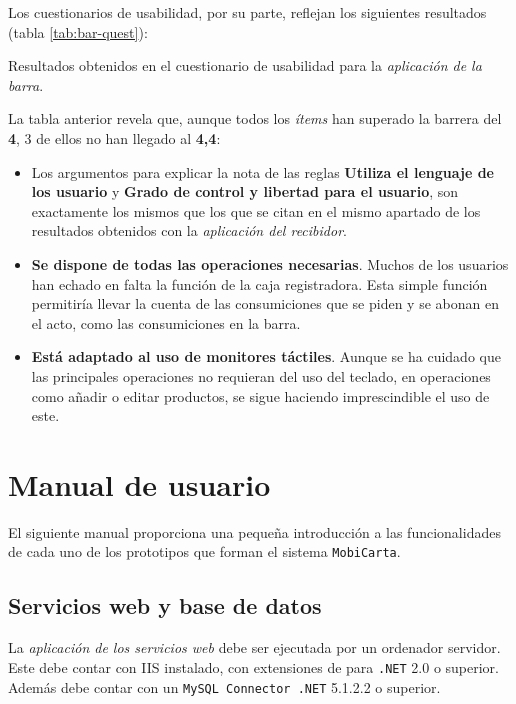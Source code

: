 Los cuestionarios de usabilidad, por su parte, reflejan los siguientes
resultados (tabla \ref{tab:bar-quest}):

\begin{table}[H]
  \centering
  \label{tab:bar-quest}
  {\normalsize
  
  }  
  \caption[Resultados obtenidos en el cuestionario de usabilidad para la
  \emph{aplicación de la barra}.]{Resultados obtenidos en el cuestionario de 
  usabilidad para la \emph{aplicación de la barra}.}
\end{table}

La tabla anterior revela que, aunque todos los \emph{ítems} han superado la
barrera del \textbf{4}, 3 de ellos no han llegado al \textbf{4,4}:
\begin{itemize}
\item Los argumentos para explicar la nota de las reglas \textbf{Utiliza el
lenguaje de los usuario} y \textbf{Grado de control y libertad para el 
usuario}, son exactamente los mismos que los que se citan en el mismo apartado
de los resultados obtenidos con la \emph{aplicación del recibidor}.
\item \textbf{Se dispone de todas las operaciones necesarias}. Muchos de los
usuarios han echado en falta la función de la caja registradora. Esta
simple función permitiría llevar la cuenta de las consumiciones que se piden
y se abonan en el acto, como las consumiciones en la barra.
\item \textbf{Está adaptado al uso de monitores táctiles}. Aunque se ha
cuidado que las principales operaciones no requieran del uso del teclado,
en operaciones como añadir o editar productos, se sigue haciendo imprescindible
el uso de este.
\end{itemize}
\newpage
\section{Manual de usuario}
El siguiente manual proporciona una pequeña introducción a las funcionalidades
de cada uno de los prototipos que forman el sistema \texttt{MobiCarta}.

\subsection{Servicios web y base de datos}
La \emph{aplicación de los servicios web} debe ser ejecutada por un ordenador
servidor. Este debe contar con \acs{IIS} instalado, con extensiones de para
\texttt{.NET} 2.0 o superior. Además debe contar con un \texttt{MySQL
Connector .NET} 5.1.2.2 o superior.

